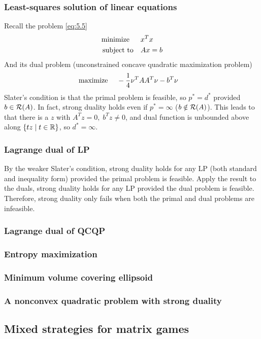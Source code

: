\subsubsection{Least-squares solution of linear equations}
Recall the problem \eqref{eq:5.5}
\begin{align*}
  \text{minimize\;\;}\quad& x^Tx\\
  \text{subject to}  \quad& Ax=b
\end{align*}
And its dual problem (unconstrained concave quadratic maximization problem)
\begin{align*}
  \text{maximize\;}\quad& -\frac{1}{4}\nu^TAA^T\nu-b^T\nu
\end{align*}
Slater's condition is that the primal problem is feasible, so $p^\ast=d^\ast$ provided $b\in{\mathcal R}(A)$.
In fact, strong duality holds even if $p^\ast=\infty$ ($b\notin{\mathcal R}(A)$).
This leads to that there is a $z$ with $A^Tz=0,\;b^Tz\neq 0$, and dual function is unbounded above along $\{tz\mid t\in\mathbb{R}\}$, so $d^\ast=\infty$.

\subsubsection{Lagrange dual of LP}
By the weaker Slater's condition, strong duality holds for any LP (both standard and inequality form) provided the primal problem is feasible.
Apply the result to the duals, strong duality holds for any LP provided the dual problem is feasible.
Therefore, strong duality only fails when both the primal and dual problems are infeasible.

\subsubsection{Lagrange dual of QCQP}
\subsubsection{Entropy maximization}
\subsubsection{Minimum volume covering ellipsoid}
\subsubsection{A nonconvex quadratic problem with strong duality}

\subsection{Mixed strategies for matrix games}

